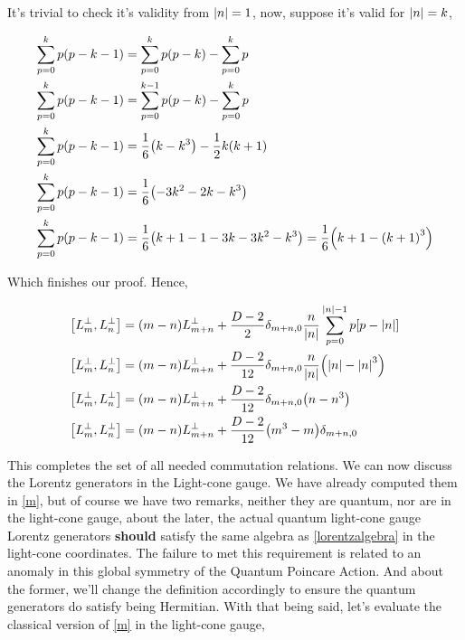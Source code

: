 It's trivial to check it's validity from $\abs{n}=1$, now, suppose it's valid for $\abs{n}=k$,

\begin{align*}
    \sum\limits_{p=0}^{k}p\qty(p-k-1)&=\sum\limits_{p=0}^{k}p\qty(p-k)-\sum\limits_{p=0}^kp\\
    \sum\limits_{p=0}^{k}p\qty(p-k-1)&=\sum\limits_{p=0}^{k-1}p\qty(p-k)-\sum\limits_{p=0}^kp\\
    \sum\limits_{p=0}^{k}p\qty(p-k-1)&=\frac16\qty(k-k^3)-\frac12k\qty(k+1)\\
    \sum\limits_{p=0}^{k}p\qty(p-k-1)&=\frac16\qty(-3k^2-2k-k^3)\\
    \sum\limits_{p=0}^{k}p\qty(p-k-1)&=\frac16\qty(k+1-1-3k-3k^2-k^3)=\frac16\qty(k+1-\qty(k+1)^3)
\end{align*}

Which finishes our proof. Hence,

\begin{align*}
    \comm{L_m^\perp}{L_n^\perp}&=\qty(m-n)L_{m+n}^\perp+\frac{D-2}{2}\delta_{m+n,0}\frac{n}{\abs{n}}\sum\limits_{p= 0}^{\abs{n}-1}p\qty[p-\abs{n}]\\
    \comm{L_m^\perp}{L_n^\perp}&=\qty(m-n)L_{m+n}^\perp+\frac{D-2}{12}\delta_{m+n,0}\frac{n}{\abs{n}}\qty(\abs{n}-\abs{n}^3)\\
    \comm{L_m^\perp}{L_n^\perp}&=\qty(m-n)L_{m+n}^\perp+\frac{D-2}{12}\delta_{m+n,0}\qty(n-n^3)\\
    \comm{L_m^\perp}{L_n^\perp}&=\qty(m-n)L_{m+n}^\perp+\frac{D-2}{12}\qty(m^3-m)\delta_{m+n,0}
\end{align*}

This completes the set of all needed commutation relations. We can now discuss the Lorentz generators in the Light-cone gauge. 
We have already computed them in \ref{m}, but of course we have two remarks, neither they are quantum, nor are in the light-cone gauge, 
about the later, the actual quantum light-cone gauge Lorentz generators \textbf{should} satisfy the same algebra as \ref{lorentzalgebra} in the 
light-cone coordinates. The failure to met this requirement is related to an anomaly in this global symmetry of the Quantum Poincare Action. 
And about the former, we'll change the definition accordingly to ensure the quantum generators do satisfy being Hermitian. With that being said, 
let's evaluate the classical version of \ref{m} in the light-cone gauge,

